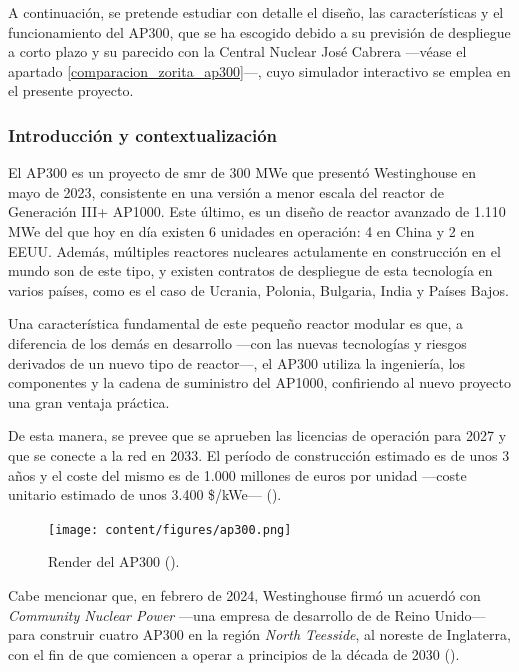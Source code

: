 A continuación, se pretende estudiar con detalle el diseño, las características y el funcionamiento del AP300, que se ha escogido debido a su previsión de despliegue a corto plazo y su parecido con la Central Nuclear José Cabrera ---véase el apartado \ref{comparacion_zorita_ap300}---, cuyo simulador interactivo se emplea en el presente proyecto.

\subsubsection{Introducción y contextualización}

El AP300 es un proyecto de \acrshort{smr} de 300 MWe que presentó Westinghouse en mayo de 2023, consistente en una versión a menor escala del reactor de Generación III+ AP1000. Este último, es un diseño de reactor avanzado de 1.110 MWe del que hoy en día existen 6 unidades en operación: 4 en China y 2 en EEUU. Además, múltiples reactores nucleares actulamente en construcción en el mundo son de este tipo, y existen contratos de despliegue de esta tecnología en varios países, como es el caso de Ucrania, Polonia, Bulgaria, India y Países Bajos.

Una característica fundamental de este pequeño reactor modular es que, a diferencia de los demás  en desarrollo ---con las nuevas tecnologías y riesgos derivados de un nuevo tipo de reactor---, el AP300 utiliza la ingeniería, los componentes y la cadena de suministro del AP1000, confiriendo al nuevo proyecto una gran ventaja práctica. 

De esta manera, se prevee que se aprueben las licencias de operación para 2027 y que se conecte a la red en 2033. El período de construcción estimado es de unos 3 años y el coste del mismo es de 1.000 millones de euros por unidad ---coste unitario estimado de unos 3.400 \$/kWe--- (\cite{ap300_westinghouse}).

\begin{figure}[h]
  \centering
  \texttt{[image: content/figures/ap300.png]}
  \caption{Render del AP300 (\cite{ap300_westinghouse}).}
  \label{fig:AP300}
\end{figure}

Cabe mencionar que, en febrero de 2024, Westinghouse firmó un acuerdó con \emph{Community Nuclear Power} ---una empresa de desarrollo de  de Reino Unido--- para construir cuatro  AP300 en la región \emph{North Teesside}, al noreste de Inglaterra, con el fin de que comiencen a operar a principios de la década de 2030 (\cite{uk_ap300_deployment}).

